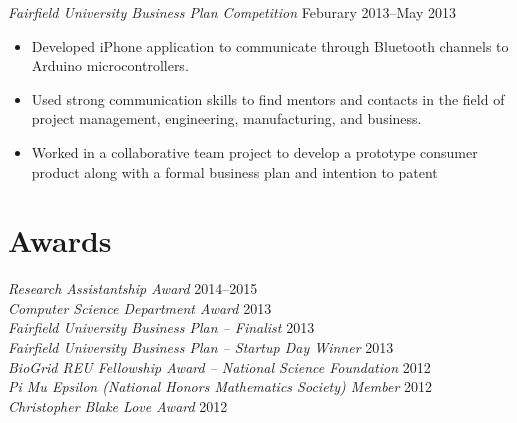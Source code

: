 \documentclass[margin, 10pt]{res}
\begin{document}
\begin{resume}
{\sl Fairfield University Business Plan Competition} \hfill Feburary 2013--May 2013 \\
\begin{itemize} \itemsep -2.5pt %
\item Developed iPhone application to communicate through Bluetooth channels to Arduino microcontrollers.
\item Used strong communication skills to find mentors and contacts in the field of project management, engineering, manufacturing, and business.
\item Worked in a collaborative team project to develop a prototype consumer product along with a formal business plan and intention to patent
\end{itemize}
 


\section{Awards} 
{\sl Research Assistantship Award} \hfill{2014--2015} \\
{\sl Computer Science Department Award} \hfill{2013} \\
{\sl Fairfield University Business Plan -- Finalist} \hfill{2013} \\
{\sl Fairfield University Business Plan -- Startup Day Winner} \hfill{2013} \\
{\sl BioGrid REU Fellowship Award -- National Science Foundation} \hfill{2012} \\
{\sl Pi Mu Epsilon (National Honors Mathematics Society) Member} \hfill{2012}\\
{\sl Christopher Blake Love Award} \hfill{2012}


\end{resume}
\end{document}
